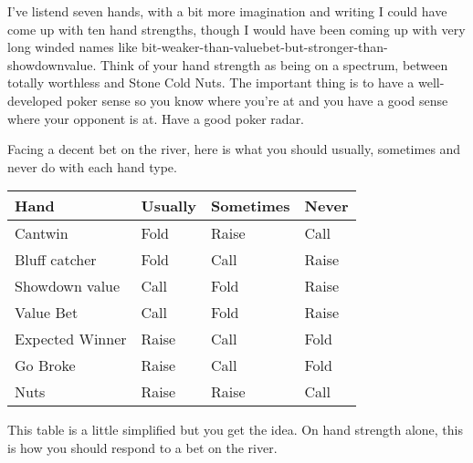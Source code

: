
I've listend seven hands, with a bit more imagination and writing
I could have come up with ten hand strengths, though I would have been
coming up with very long winded names like
bit-weaker-than-valuebet-but-stronger-than-showdownvalue. Think of
your hand strength as being on a spectrum, between totally
worthless and Stone Cold Nuts. The important thing is to have
a well-developed poker sense so you know where you're at and you
have a good sense where your opponent is at. Have a good poker radar.

Facing a decent bet on the river, here is what you should
usually, sometimes and never do with each hand type.

\begin{tabular}{|l|l|l|l|} \hline
Hand    &  Usually & Sometimes & Never \\ \hline
Cantwin & Fold  & Raise     & Call  \\ \hline
Bluff catcher  & Fold & Call & Raise \\ \hline
Showdown value & Call & Fold & Raise \\ \hline
Value Bet & Call & Fold & Raise \\ \hline
Expected Winner & Raise & Call & Fold \\ \hline
Go Broke & Raise & Call & Fold \\ \hline
Nuts     & Raise & Raise & Call \\ \hline
\end{tabular}

This table is a little simplified but you get the idea. On hand strength
alone, this is how you should respond to a bet on the river.
